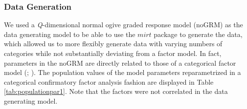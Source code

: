 \documentclass[a4paper,man,natbib]{apa6}
\begin{document}
\begin{linenumbers}
\subsubsection{Data Generation}
We used a \textit{Q}-dimensional normal ogive graded response model (noGRM) as the data generating model to be able to use the $mirt$ package \citep{mirt2012} to generate the data, which allowed us to more flexibly generate data with varying numbers of categories while not substantially deviating from a factor model. In fact, parameters in the noGRM are directly related to those of a categorical factor model (\citealp{takane1987relationship}; \citealp{kamata2008note}). 
The population values of the model parameters reparametrized in a categorical confirmatory factor analysis fashion are displayed in Table \ref{tab:populationpar1}. Note that the factors were not correlated in the data generating model.



\end{linenumbers}
\end{document}
